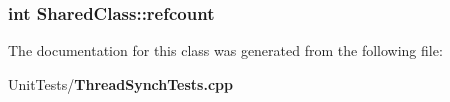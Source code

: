 \subsubsection{\setlength{\rightskip}{0pt plus 5cm}int {\bf Shared\-Class::refcount}\hspace{0.3cm}{\tt  [static]}}\label{class_shared_class_37ba924252b4fb3705b21e755ef27c89}




The documentation for this class was generated from the following file:\begin{CompactItemize}
\item 
Unit\-Tests/{\bf Thread\-Synch\-Tests.cpp}\end{CompactItemize}

